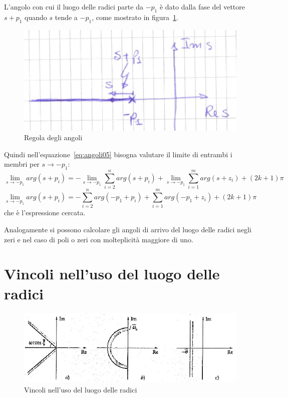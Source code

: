\documentclass[a4paper]{report}
\begin{document}
L'angolo con cui il luogo delle radici parte da $-p_1$ \`e dato dalla
fase del vettore $s + p_1$ quando $s$ tende a $-p_1$, come mostrato in
figura~\ref{fig:regolaAngoli}.
\begin{figure}[!h]
  \begin{center}
    \includegraphics[scale=0.3]{./images/regolaAngoli}
    \caption{Regola degli angoli}\label{fig:regolaAngoli}
  \end{center}
\end{figure}
Quindi nell'equazione~\ref{eq:angoli05} bisogna valutare il limite di
entrambi i membri per $s \to -p_1$:
\[
\lim_{s \to -p_1} arg(s + p_i) = - \lim_{s \to -p_1}\sum\limits_{i = 2}^{n} arg(s + p_i) +
  \lim_{s \to -p_1}\sum\limits_{i = 1}^{m} arg(s + z_i) + (2k + 1)\pi
\]
\[
\lim_{s \to -p_1} arg(s + p_i) = - \sum\limits_{i = 2}^{n} arg(-p_1 + p_i) +
  \sum\limits_{i = 1}^{m} arg(-p_1 + z_i) + (2k + 1)\pi
\]
che \`e l'espressione cercata.

Analogamente si possono calcolare gli angoli di arrivo del luogo delle
radici negli zeri e nel caso di poli o zeri con molteplicit\`a
maggiore di uno.
\section{Vincoli nell'uso del luogo delle radici}
\begin{figure}[!h]
  \begin{center}
    \includegraphics[scale=0.4]{./images/vincoliLuogo}
    \caption{Vincoli nell'uso del luogo delle
      radici}\label{fig:vincoliLuogo}
  \end{center}
\end{figure}
\end{document}
